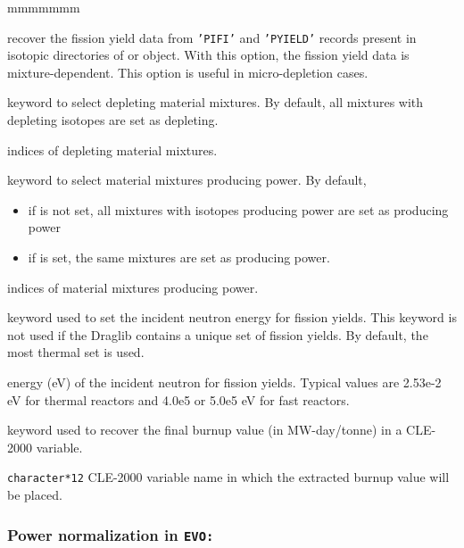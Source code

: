\begin{ListeDeDescription}{mmmmmmm}
\item[\moc{PIFI}]  recover the fission yield data from {\tt 'PIFI'} and {\tt 'PYIELD'} records present in isotopic directories
of  or  object. With this option, the fission yield data is mixture-dependent. This option is useful
in micro-depletion cases.

\item[\moc{MIXB}]  keyword to select depleting material mixtures. By default, all mixtures
with depleting isotopes are set as depleting.

\item[\dusa{mixbrn}] indices of depleting material mixtures.

\item[\moc{MIXP}]  keyword to select material mixtures producing power. By default, 
\begin{itemize}
\item if  is not set, all mixtures with isotopes producing power are set as producing power
\item if  is set, the same mixtures  are set as producing power.
\end{itemize}

\item[\dusa{mixpwr}] indices of material mixtures producing power.

\item[\moc{ENERGY}]  keyword used to set the incident neutron energy for fission yields. This keyword is not used if the Draglib contains a unique set of fission yields. By default, the most thermal set is used.

\item[\dusa{enrgyd}] energy (eV) of the incident neutron for fission yields. Typical values are 2.53e-2 eV for thermal reactors and 4.0e5 or 5.0e5 eV for fast reactors.

\item[\moc{PICK}]  keyword used to recover the final burnup value (in MW-day/tonne) in a CLE-2000 variable.

\item[\dusa{burnup}] \texttt{character*12} CLE-2000 variable name in which the extracted burnup value will be placed.

\end{ListeDeDescription}

\subsubsection{Power normalization in {\tt EVO:}}\label{sect:powerevo}


